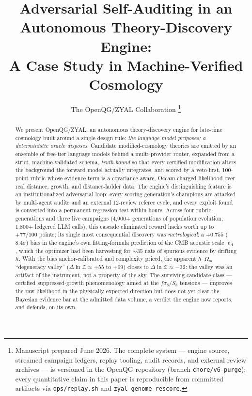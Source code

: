 \documentclass[journal]{IEEEtran}
\newcommand{\dlnz}{\Delta\ln\mathcal{Z}}
\newcommand{\fsig}{f\sigma_8}
\newcommand{\lA}{\ell_A}
\begin{document}
\title{Adversarial Self-Auditing in an Autonomous Theory-Discovery Engine:\\
A Case Study in Machine-Verified Cosmology}

\author{The OpenQG/ZYAL Collaboration%
\thanks{Manuscript prepared June 2026. The complete system --- engine source, streamed
campaign ledgers, replay tooling, audit records, and external review archives --- is
versioned in the OpenQG repository (branch \texttt{chore/v6-purge}); every quantitative
claim in this paper is reproducible from committed artifacts via \texttt{ops/replay.sh}
and \texttt{zyal genome rescore}.}}

\maketitle

\begin{abstract}
We present OpenQG/ZYAL, an autonomous theory-discovery engine for late-time cosmology
built around a single design rule: \emph{the language model proposes; a deterministic
oracle disposes}. Candidate modified-cosmology theories are emitted by an ensemble of
free-tier language models behind a multi-provider router, expanded from a strict,
machine-validated schema, \emph{truth-bound} so that every certified modification alters
the background the forward model actually integrates, and scored by a veto-first,
100-point rubric whose evidence term is a covariance-aware, Occam-charged likelihood over
real distance, growth, and distance-ladder data. The engine's distinguishing feature is
an institutionalized adversarial loop: every scoring generation's champions are attacked
by multi-agent audits and an external 12-review referee cycle, and every exploit found is
converted into a permanent regression test within hours. Across four rubric generations
and three live campaigns (4{,}900+ generations of population evolution, 1{,}800+ ledgered
LLM calls), this cascade eliminated reward hacks worth up to $+77/100$ points; its single
most consequential discovery was \emph{metrological}: a $+0.755$ ($8.4\sigma$) bias in the
engine's own fitting-formula prediction of the CMB acoustic scale $\lA$, which the
optimizer had been harvesting for $\sim$35 nats of spurious evidence by drifting $h$. With
the bias anchor-calibrated and complexity priced, the apparent $h$--$\Omega_m$
``degeneracy valley'' ($\dlnz \approx +55$ to $+69$) closes to $\dlnz \approx -32$: the
valley was an artifact of the instrument, not a property of the sky. The surviving
candidate class --- certified suppressed-growth phenomenology aimed at the
$\fsig$/$S_8$ tensions --- improves the raw likelihood in the physically expected
direction but does not yet clear the Bayesian evidence bar at the admitted data volume,
a verdict the engine now reports, and defends, on its own.
\end{abstract}
\end{document}
